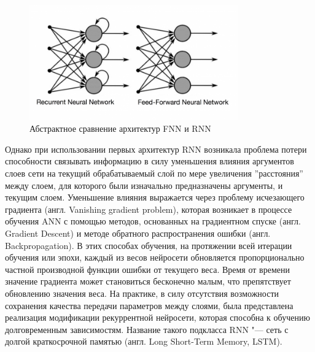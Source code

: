 \documentclass[bachelor, och, coursework]{SCWorks}
\begin{document}
        \begin{figure}[H]
            \centering
            \includegraphics[width=0.8\textwidth]{pics/rnn-vs-fnn.png}
            \caption{Абстрактное сравнение архитектур FNN и RNN}
        \end{figure}

        Однако при использовании первых архитектур RNN возникала проблема потери
        способности связывать информацию в силу уменьшения влияния аргументов
        слоев сети на текущий обрабатываемый слой по мере увеличения
        ''расстояния'' между слоем, для которого были изначально предназначены
        аргументы, и текущим слоем. Уменьшение влияния выражается через проблему
        исчезающего градиента (англ. Vanishing gradient problem), которая
        возникает в процессе обучения ANN с помощью методов, основанных на
        градиентном спуске (англ. Gradient Descent) и методе обратного
        распространения ошибки (англ. Backpropagation). В этих способах
        обучения, на протяжении всей итерации обучения или эпохи, каждый из
        весов нейросети обновляется пропорционально частной производной функции
        ошибки от текущего веса. Время от времени значение градиента может
        становиться бесконечно малым, что препятствует обновлению значения веса.
        На практике, в силу отсутствия возможности сохранения качества передачи
        параметров между слоями, была представлена реализация модификации
        рекуррентной нейросети, которая способна к обучению долговременным
        зависимостям. Название такого подкласса RNN "--- сеть с долгой
        краткосрочной памятью (англ. Long Short-Term Memory, LSTM).
\end{document}
